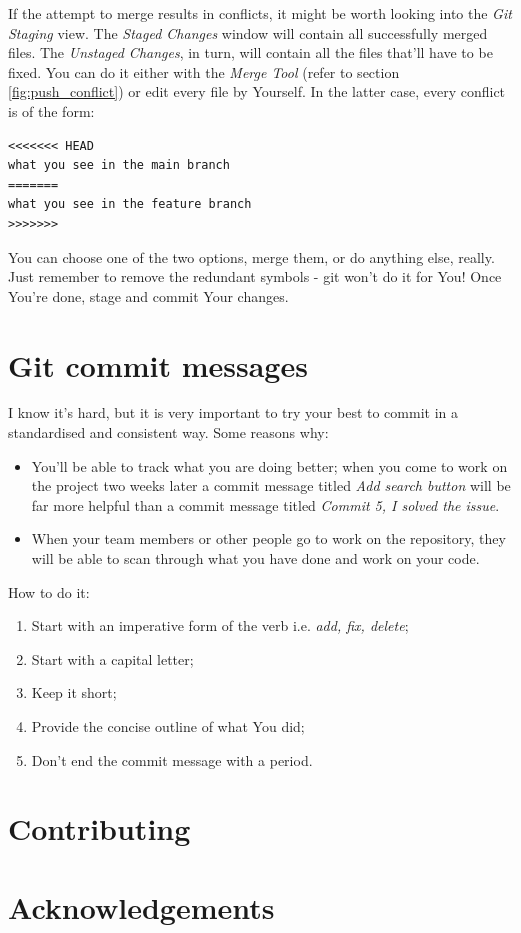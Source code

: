 \documentclass{article}
\begin{document}
If the attempt to merge results in conflicts, it might be worth looking into the \textit{Git Staging} view. The \textit{Staged Changes} window will contain all successfully merged files. The \textit{Unstaged Changes}, in turn, will contain all the files that'll have to be fixed. You can do it either with the \textit{Merge Tool} (refer to section \ref{fig:push_conflict}) or edit every file by Yourself. In the latter case, every conflict is of the form:
\begin{verbatim}
<<<<<<< HEAD
what you see in the main branch
=======
what you see in the feature branch
>>>>>>>
\end{verbatim}
You can choose one of the two options, merge them, or do anything else, really. Just remember to remove the redundant symbols - git won't do it for You! Once You're done, stage and commit Your changes.


\section{Git commit messages}
\label{sec:commit_messages}
I know it's hard, but it is very important to try your best to commit in a standardised and consistent way. Some reasons why: 
\begin{itemize}
    \item You'll be able to track what you are doing better; when you come to work on the project two weeks later a commit message titled \textit{Add search button} will be far more helpful than a commit message titled \textit{Commit 5, I solved the issue}.
    \item When your team members or other people go to work on the repository, they will be able to scan through what you have done and work on your code. 
\end{itemize}

How to do it: 
\begin{enumerate}
    \item Start with an imperative form of the verb i.e. \textit{add, fix, delete};
    \item Start with a capital letter; 
    \item Keep it short;
    \item Provide the concise outline of what You did;
    \item Don't end the commit message with a period. 
\end{enumerate}

\section{Contributing}
\label{sec:contributing}

\section{Acknowledgements}
\end{document}
